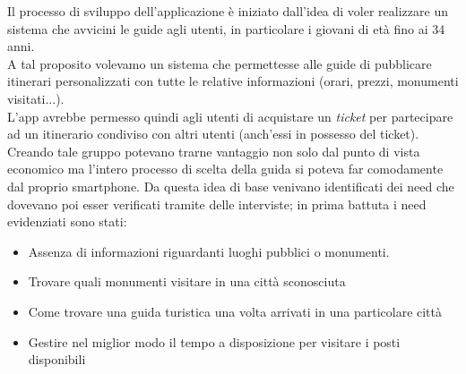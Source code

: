 Il processo di sviluppo dell'applicazione è iniziato dall'idea di voler realizzare un sistema che avvicini le guide agli utenti, in particolare i giovani di età fino ai 34 anni.\\
A tal proposito volevamo un sistema che permettesse alle guide di pubblicare itinerari personalizzati con tutte le relative informazioni (orari, prezzi, monumenti visitati...).\\
L'app avrebbe permesso quindi agli utenti di acquistare un \emph{ticket} per partecipare ad un itinerario condiviso con altri utenti (anch'essi in possesso del ticket). Creando tale gruppo potevano trarne vantaggio non solo dal punto di vista economico ma l'intero processo di scelta della guida si poteva far comodamente dal proprio smartphone.
Da questa idea di base venivano identificati dei need che dovevano poi esser verificati tramite delle interviste; in prima battuta i need evidenziati sono stati:
\begin{itemize}
	\item Assenza di informazioni riguardanti luoghi pubblici o monumenti.
	\item Trovare quali monumenti visitare in una città sconosciuta 
	\item Come trovare una guida turistica una volta arrivati in una particolare città
	\item Gestire nel miglior modo il tempo a disposizione per visitare i posti disponibili
	
\end{itemize}
